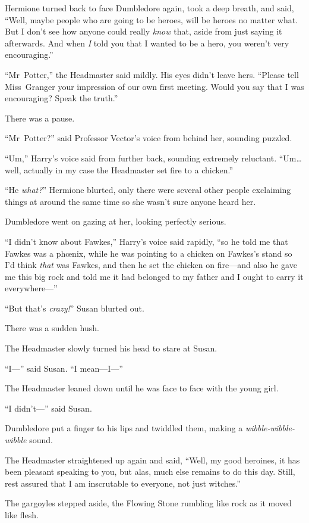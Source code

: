 Hermione turned back to face Dumbledore again, took a deep breath, and said, “Well, maybe people who are going to be heroes, will be heroes no matter what. But I don’t see how anyone could really \emph{know} that, aside from just saying it afterwards. And when \emph{I} told you that I wanted to be a hero, you weren’t very encouraging.”

“Mr~Potter,” the Headmaster said mildly. His eyes didn’t leave hers. “Please tell Miss~Granger your impression of our own first meeting. Would you say that I was encouraging? Speak the truth.”

There was a pause.

“Mr~Potter?” said Professor Vector’s voice from behind her, sounding puzzled.

“Um,” Harry’s voice said from further back, sounding extremely reluctant. “Um…well, actually in my case the Headmaster set fire to a chicken.”

“He \emph{what?}” Hermione blurted, only there were several other people exclaiming things at around the same time so she wasn’t sure anyone heard her.

Dumbledore went on gazing at her, looking perfectly serious.

“I didn’t know about Fawkes,” Harry’s voice said rapidly, “so he told me that Fawkes was a phœnix, while he was pointing to a chicken on Fawkes’s stand so I’d think \emph{that} was Fawkes, and then he set the chicken on fire—and also he gave me this big rock and told me it had belonged to my father and I ought to carry it everywhere—”

“But that’s \emph{crazy!}” Susan blurted out.

There was a sudden hush.

The Headmaster slowly turned his head to stare at Susan.

“I—” said Susan. “I mean—I—”

The Headmaster leaned down until he was face to face with the young girl.

“I didn’t—” said Susan.

Dumbledore put a finger to his lips and twiddled them, making a \emph{wibble-wibble-wibble} sound.

The Headmaster straightened up again and said, “Well, my good heroines, it has been pleasant speaking to you, but alas, much else remains to do this day. Still, rest assured that I am inscrutable to everyone, not just witches.”

The gargoyles stepped aside, the Flowing Stone rumbling like rock as it moved like flesh.


